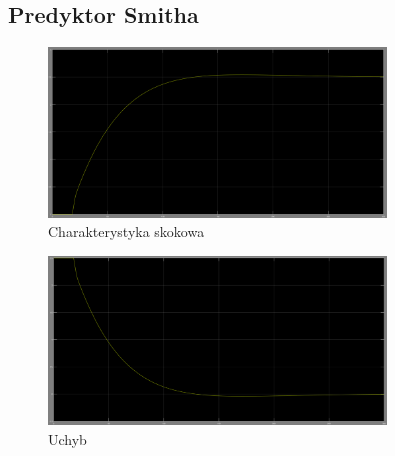 \documentclass[a4paper]{article}
\begin{document}
		\subsection{Predyktor Smitha}
			\begin{figure}[H]
				\centering
				\caption{Charakterystyka skokowa}
				\includegraphics[width=0.8\textwidth]{./img/smith_step.png}
			\end{figure}
			\begin{figure}[H]
				\centering
				\caption{Uchyb}
				\includegraphics[width=0.8\textwidth]{./img/smith_error_correct.png}
			\end{figure}
\end{document}
